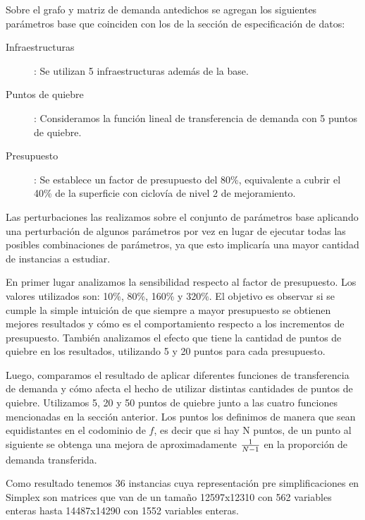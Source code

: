 \documentclass{article}
\begin{document}
  Sobre el grafo y matriz de demanda antedichos se agregan los siguientes parámetros base que coinciden con los de la sección de especificación de datos:

  \begin{description}
    \item[Infraestructuras]: Se utilizan 5 infraestructuras además de la base.
    \item[Puntos de quiebre]: Consideramos la función lineal de transferencia de demanda con 5 puntos de quiebre.
    \item[Presupuesto]: Se establece un factor de presupuesto del 80\%, equivalente a cubrir el 40\% de la superficie con ciclovía de nivel 2 de mejoramiento.
  \end{description}

  Las perturbaciones las realizamos sobre el conjunto de parámetros base aplicando una perturbación de algunos parámetros por vez en lugar de ejecutar todas las posibles combinaciones de parámetros, ya que esto implicaría una mayor cantidad de instancias a estudiar.

  En primer lugar analizamos la sensibilidad respecto al factor de presupuesto. Los valores utilizados son: 10\%, 80\%, 160\% y 320\%. El objetivo es observar si se cumple la simple intuición de que siempre a mayor presupuesto se obtienen mejores resultados y cómo es el comportamiento respecto a los incrementos de presupuesto. También analizamos el efecto que tiene la cantidad de puntos de quiebre en los resultados, utilizando 5 y 20 puntos para cada presupuesto.

  Luego, comparamos el resultado de aplicar diferentes funciones de transferencia de demanda y cómo afecta el hecho de utilizar distintas cantidades de puntos de quiebre. Utilizamos 5, 20 y 50 puntos de quiebre junto a las cuatro funciones mencionadas en la sección anterior. Los puntos los definimos de manera que sean equidistantes en el codominio de $f$, es decir que si hay N puntos, de un punto al siguiente se obtenga una mejora de aproximadamente ${1 \over N - 1}$ en la proporción de demanda transferida.

  Como resultado tenemos 36 instancias cuya representación pre simplificaciones en Simplex son matrices que van de un tamaño 12597x12310 con 562 variables enteras hasta 14487x14290 con 1552 variables enteras.
\end{document}
